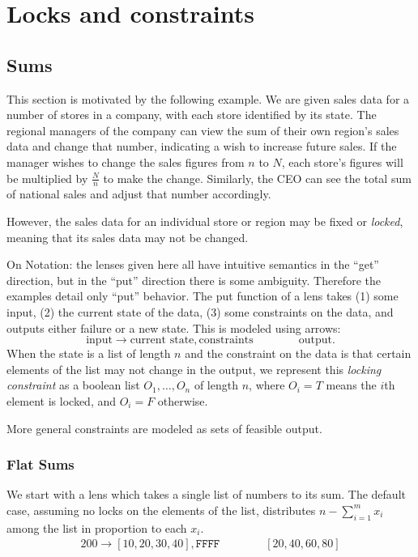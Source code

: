 \documentclass{article}
\newcommand\F{\texttt F}
\newcommand\form[4]{#1 \rightarrow #2, #3 \qquad \qquad #4}
\begin{document}
\section{Locks and constraints}
\subsection*{Sums}

This section is motivated by the following example. We are given
sales data for a number of stores in a company, with 
each store identified by its state. The regional managers 
of the company can view the sum of their own region's sales 
data and change that number, indicating a wish to increase future
sales. If the manager wishes to change the sales figures from
$n$ to $N$, each store's figures will be multiplied by $\frac N n$
to make the change.
Similarly, the CEO can see the total sum of national
sales and adjust that number accordingly.  


However, the sales data
for an individual store or region may be fixed or \emph{locked},
meaning that its sales data may not be changed.

On Notation: the lenses given here all have intuitive semantics in the 
``get'' direction, but in the ``put'' direction there is some
ambiguity. Therefore the examples detail only ``put'' behavior.
The put function of a lens takes (1) some input, (2) the current state of
the data, (3) some constraints on the data, and outputs either
failure or a new state. This is modeled using arrows:
\[ \form {\text{input}} {\text{current state}} {\text{constraints}} {\text{output}}.\]
When the state is a list of length $n$ and the constraint
on the data is that certain elements of the list may not change
in the output, we represent this \emph{locking constraint} as a boolean list
$O_1,\ldots,O_n$ of length $n$, where $O_i=T$ means the $i$th element
is locked, and $O_i=F$ otherwise. 

More general constraints are modeled as sets of feasible output.

\subsubsection*{Flat Sums}

We start with a lens which takes a single list of numbers
to its sum.
The default case, assuming no locks on the elements of the list,
distributes $n-\sum_{i=1}^m x_i$ among the list in proportion to
each $x_i$.
\begin{align}
    \form {200} {[10,20,30,40]} {\F\F\F\F} {[20,40,60,80]}
\end{align}
\end{document}

